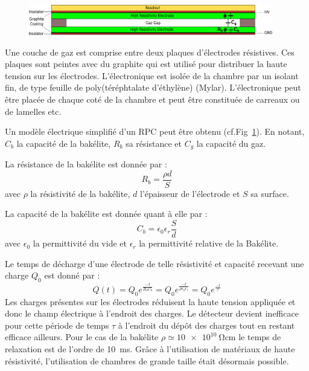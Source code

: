 \begin{figure}[th!]
	\centering
	\includegraphics[width=0.95\textwidth]{RPC/scheme_first.png}
	\label{RPCscheme}
\end{figure}
\vspace{-0.1cm}
Une couche de gaz est comprise entre deux plaques d'électrodes résistives. Ces plaques sont peintes avec du graphite qui est utilisé pour distribuer la haute tension sur les électrodes. L'électronique est isolée de la chambre par un isolant fin, de type feuille de poly(téréphtalate d'éthylène) (Mylar). L'électronique peut être placée de chaque coté de la chambre et peut être constituée de carreaux ou de lamelles etc.

Un modèle électrique simplifié d'un RPC peut être obtenu (cf.Fig~\ref{RPCscheme}). En notant, $C_{b}$ la capacité de la bakélite, $R_{b}$ sa résistance et $C_{g}$ la capacité du gaz.

La résistance de la bakélite est donnée par :
\begin{equation}
R_b=\frac{\rho d}{S}
\end{equation}
avec $\rho$ la résistivité de la bakélite, $d$ l'épaisseur de l'électrode et $S$ sa surface.

La capacité de la bakélite est donnée quant à elle par :
\begin{equation}
C_{b}=\epsilon_0\epsilon_r\frac{S}{d}
\end{equation} 
avec $\epsilon_0$ la permittivité du vide et $\epsilon_r$ la permittivité relative de la Bakélite.

Le temps de décharge d'une électrode de telle résistivité et capacité recevant une charge $Q_{0}$ est donné par :
\begin{equation}
Q(t)=Q_{0}e^{\frac{-t}{R_bC_b}}=Q_{0}e^{\frac{-t}{\rho\epsilon_{0}\epsilon_{r}}}=Q_{0}e^{\frac{-t}{\tau}}
\end{equation}
Les charges présentes sur les électrodes réduisent la haute tension appliquée et donc le champ électrique à l'endroit des charges. Le détecteur devient inefficace pour cette période de temps $\tau$ à l'endroit du dépôt des charges tout en restant efficace ailleurs. Pour le cas de la bakélite $\rho\simeq\SI{10e10}{\ohm\centi\meter}$ le temps de relaxation est de l'ordre de \SI{10}{\milli\second}. Grâce à l'utilisation de matériaux de haute résistivité, l'utilisation de chambres de grande taille était désormais possible.


